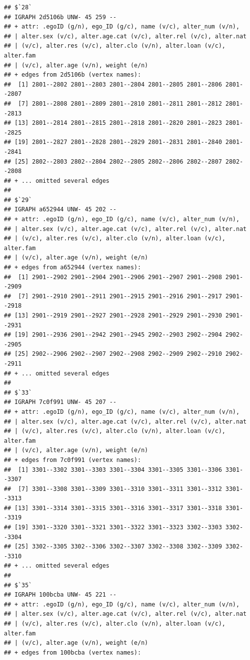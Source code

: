 \documentclass[
]{book}
\begin{document}
\begin{verbatim}
## $`28`
## IGRAPH 2d5106b UNW- 45 259 -- 
## + attr: .egoID (g/n), ego_ID (g/c), name (v/c), alter_num (v/n),
## | alter.sex (v/c), alter.age.cat (v/c), alter.rel (v/c), alter.nat
## | (v/c), alter.res (v/c), alter.clo (v/n), alter.loan (v/c), alter.fam
## | (v/c), alter.age (v/n), weight (e/n)
## + edges from 2d5106b (vertex names):
##  [1] 2801--2802 2801--2803 2801--2804 2801--2805 2801--2806 2801--2807
##  [7] 2801--2808 2801--2809 2801--2810 2801--2811 2801--2812 2801--2813
## [13] 2801--2814 2801--2815 2801--2818 2801--2820 2801--2823 2801--2825
## [19] 2801--2827 2801--2828 2801--2829 2801--2831 2801--2840 2801--2841
## [25] 2802--2803 2802--2804 2802--2805 2802--2806 2802--2807 2802--2808
## + ... omitted several edges
## 
## $`29`
## IGRAPH a652944 UNW- 45 202 -- 
## + attr: .egoID (g/n), ego_ID (g/c), name (v/c), alter_num (v/n),
## | alter.sex (v/c), alter.age.cat (v/c), alter.rel (v/c), alter.nat
## | (v/c), alter.res (v/c), alter.clo (v/n), alter.loan (v/c), alter.fam
## | (v/c), alter.age (v/n), weight (e/n)
## + edges from a652944 (vertex names):
##  [1] 2901--2902 2901--2904 2901--2906 2901--2907 2901--2908 2901--2909
##  [7] 2901--2910 2901--2911 2901--2915 2901--2916 2901--2917 2901--2918
## [13] 2901--2919 2901--2927 2901--2928 2901--2929 2901--2930 2901--2931
## [19] 2901--2936 2901--2942 2901--2945 2902--2903 2902--2904 2902--2905
## [25] 2902--2906 2902--2907 2902--2908 2902--2909 2902--2910 2902--2911
## + ... omitted several edges
## 
## $`33`
## IGRAPH 7c0f991 UNW- 45 207 -- 
## + attr: .egoID (g/n), ego_ID (g/c), name (v/c), alter_num (v/n),
## | alter.sex (v/c), alter.age.cat (v/c), alter.rel (v/c), alter.nat
## | (v/c), alter.res (v/c), alter.clo (v/n), alter.loan (v/c), alter.fam
## | (v/c), alter.age (v/n), weight (e/n)
## + edges from 7c0f991 (vertex names):
##  [1] 3301--3302 3301--3303 3301--3304 3301--3305 3301--3306 3301--3307
##  [7] 3301--3308 3301--3309 3301--3310 3301--3311 3301--3312 3301--3313
## [13] 3301--3314 3301--3315 3301--3316 3301--3317 3301--3318 3301--3319
## [19] 3301--3320 3301--3321 3301--3322 3301--3323 3302--3303 3302--3304
## [25] 3302--3305 3302--3306 3302--3307 3302--3308 3302--3309 3302--3310
## + ... omitted several edges
## 
## $`35`
## IGRAPH 100bcba UNW- 45 221 -- 
## + attr: .egoID (g/n), ego_ID (g/c), name (v/c), alter_num (v/n),
## | alter.sex (v/c), alter.age.cat (v/c), alter.rel (v/c), alter.nat
## | (v/c), alter.res (v/c), alter.clo (v/n), alter.loan (v/c), alter.fam
## | (v/c), alter.age (v/n), weight (e/n)
## + edges from 100bcba (vertex names):

\end{verbatim}
\end{document}
